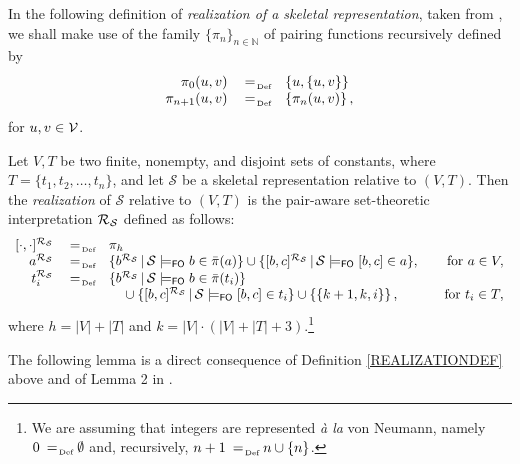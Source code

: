 \documentclass[manyauthors]{fundam}
\newcommand{\nonpairssym}{\bar{\pi}}
\newcommand{\nonpairs}[1]{\nonpairssym(#1)}
\newcommand{\atset}{\mathcal{S}}
\newcommand{\consta}{a}
\newcommand{\constb}{b}
\newcommand{\constc}{c}
\newcommand{\fomodels}[2]{#1 \models_{\mathsf{FO}} #2}
\begin{document}
In the following definition of \emph{realization of a skeletal
representation}, taken from \cite[Definition~1]{CanLonNic2011},
we shall make use of the family $\{\pi_n\}_{n \in \mathbb{N}}$ of
pairing functions recursively defined by
$$
\begin{array}{rcl}
   \pi_0(u,v) & \defAs & \{u, \{u,v\}\}\\
   \pi_{n+1}(u,v) & \defAs & \{ \pi_n(u,v)\}\, ,
\end{array}
$$
for $u,v \in \mathcal{V}$.

\begin{definition}\label{REALIZATIONDEF}
Let $V,T$ be two finite, nonempty, and disjoint sets of constants, 
where $T=\{t_1, t_2, \ldots, t_n\}$, and let $\atset$ be a skeletal 
representation relative to $(V,T)$.
%
Then the \emph{realization} of $\atset$ relative to $(V,T)$ is
the pair-aware set-theoretic interpretation $\Realization_{\!\atset}$ 
defined as follows:
\[
\begin{array}{rclr}
	[\cdot,\cdot]^{\Realization_{\!\atset}} & \defAs &  \pi_{h} & \\
	\consta^{\Realization_{\!\atset}} & \defAs & 
\{\constb^{\Realization_{\!\atset}} \, | \, \fomodels{\atset}{\constb 
\in \nonpairs{\consta}}\} \cup 
\{[\constb,\constc]^{\Realization_{\!\atset}} \, | \, 
\fomodels{\atset}{[\constb,\constc] \in \consta}\},~~~& \mbox{for 
}\consta \in V,\\
	t_i^{\Realization_{\!\atset}} & \defAs & 
\{\constb^{\Realization_{\!\atset}} \, | \, \fomodels{\atset}{\constb 
\in \nonpairs{t_i}}\}  &\\
	&&\quad {} \cup \{[\constb,\constc]^{\Realization_{\!\atset}} 
\, | \, \fomodels{\atset}{[\constb,\constc] \in t_i} \} \cup \left\{ 
\left\{k+1, k, i\right\} \right\}, & \mbox{for }t_i\in T,\\
\end{array}
\]
where $h = |V|+|T|$ and  $k=|V| \cdot (|V| + |T| + 3)$.\footnote{We 
are assuming that
integers are represented \emph{\`a la} von Neumann, namely $0 \defAs
\emptyset$ and, recursively, $n+1 \defAs n \cup \{n\}$.} %
\end{definition}
%
The following lemma is a direct consequence of Definition 
\ref{REALIZATIONDEF} above and of Lemma 2 in 
\cite{CanLonNic2011}.
\end{document}
